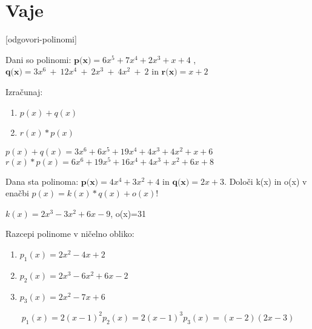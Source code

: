 \section{Vaje}
\label{sec:polinomi-funkcije-vaje}


\def\datotekaOdgovori{odgovori-polinomi}

[\datotekaOdgovori]

%

\begin{vaja}
  Dani so polinomi: $\textbf{p(x)}=6x^5+7x^4+2x^3+x+4$ , 
$\textbf{q(x)}=3x^6~+~12x^4~+~2x^3~+~4x^2~+~2$ in $\textbf{r(x)}=x+2$

Izračunaj: 
\begin{enumerate}
\item $p(x)+q(x)$ 
\item $r(x)*p(x)$
\end{enumerate}

  \begin{odgovor}
    $p(x)+q(x)=3x^6+6x^5+19x^4+4x^3+4x^2+x+6$
$r(x)*p(x)= 6x^6+19x^5+16x^4+4x^3+x^2+6x+8$
  \end{odgovor}
\end{vaja}

\begin{vaja}
 Dana sta polinoma:  $\textbf{p(x)}=4x^4+3x^2+4$ in $\textbf{q(x)}=2x+3$. Določi k(x) in o(x) v enačbi $p(x)=k(x)*q(x)+o(x)$!

  \begin{odgovor}
    $k(x)=2x^3-3x^2+6x-9$, o(x)=31
  \end{odgovor}
\end{vaja}

\begin{vaja}
 Razcepi polinome v ničelno obliko:
\begin{enumerate}
\item $p_1(x)=2x^2-4x+2$
\item $p_2(x)= 2x^3-6x^2+6x-2$
\item $p_3(x)=2x^2-7x+6$
\end{enumerate}
  \begin{odgovor}
   \[
p_1(x)=2(x-1)^2
p_2(x)=2(x-1)^3
p_3(x)=(x-2)(2x-3)
\] 
 \end{odgovor}
\end{vaja}

